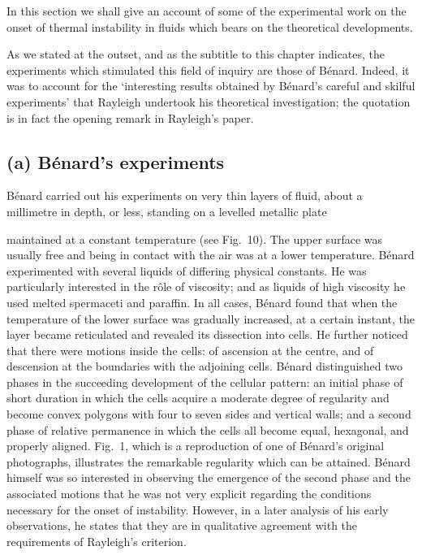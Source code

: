 In this section we shall give an account of some of the experimental
work on the onset of thermal instability in fluids which bears on the
theoretical developments.

As we stated at the outset, and as the subtitle to this chapter indicates,
the experiments which stimulated this field of inquiry are those of
B\'enard.  Indeed, it was to account for the `interesting results obtained
by B\'enard's careful and skilful experiments' that Rayleigh undertook
his theoretical investigation; the quotation is in fact the opening remark
in Rayleigh's paper.


\subsection*{(a) B\'enard's experiments}

B\'enard carried out his experiments on very thin layers of fluid, about
a millimetre in depth, or less, standing on a levelled metallic plate


\noindent
maintained at a constant temperature (see Fig.~10).  The upper surface
was usually free and being in contact with the air was at a lower temperature.
B\'enard experimented with several liquids of differing physical
constants.  He was particularly interested in the r\^ole of viscosity; and
as liquids of high viscosity he used melted spermaceti and paraffin.  In
all cases, B\'enard found that when the temperature of the lower surface
was gradually increased, at a certain instant, the layer became reticulated
and revealed its dissection into cells.  He further noticed that there were
motions inside the cells: of ascension at the centre, and of descension
at the boundaries with the adjoining cells.  B\'enard distinguished two
phases in the succeeding development of the cellular pattern: an initial
phase of short duration in which the cells acquire a moderate degree
of regularity and become convex polygons with four to seven sides and
vertical walls; and a second phase of relative permanence in which the
cells all become equal, hexagonal, and properly aligned.  Fig.~1, which is
a reproduction of one of B\'enard's original photographs, illustrates the
remarkable regularity which can be attained.  B\'enard himself was so
interested in observing the emergence of the second phase and the
associated motions that he was not very explicit regarding the conditions
necessary for the onset of instability.  However, in a later analysis of his
early observations, he states that they are in qualitative agreement with
the requirements of Rayleigh's criterion.

